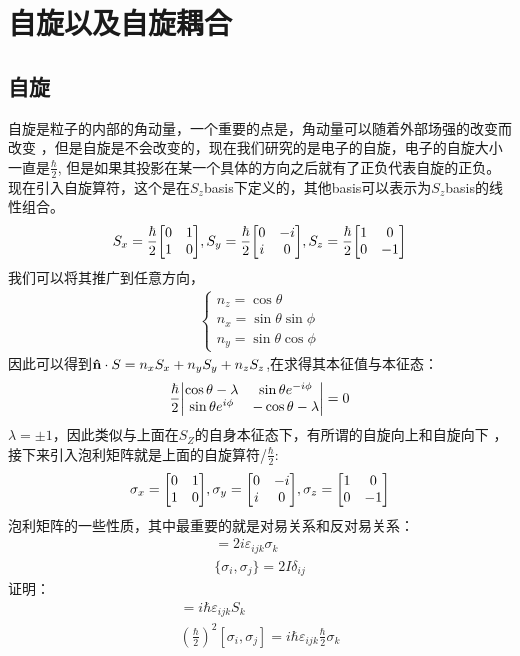 \documentclass[UTF8]{article}
\numberwithin{equation}{section}
\begin{document}
\section{自旋以及自旋耦合}
\subsection{自旋}
自旋是粒子的内部的角动量，一个重要的点是，角动量可以随着外部场强的改变而改变
，但是自旋是不会改变的，现在我们研究的是电子的自旋，电子的自旋大小一直是$\frac{\hbar}{2}$,
但是如果其投影在某一个具体的方向之后就有了正负代表自旋的正负。
现在引入自旋算符，这个是在$S_z$basis下定义的，其他basis可以表示为$S_z$basis的线性组合。
\begin{align*}
    S_x=\frac{\hbar}{2}\mqty[0 & 1 \\1&0],S_y=\frac{\hbar}{2}\mqty[0&-i\\i&0],S_z=\frac{\hbar}{2}\mqty[1&0\\0&-1]
\end{align*}
我们可以将其推广到任意方向，
\begin{align*}
    \begin{cases}
        n_z=\cos \theta           \\
        n_x=\sin \theta \sin \phi \\
        n_y=\sin \theta \cos\phi
    \end{cases}
\end{align*}
因此可以得到$\vu{n} \cdot S=n_xS_x+n_yS_y+n_zS_z$,在求得其本征值与本征态：
\begin{align*}
    \frac{\hbar}{2}\mqty|\cos \theta-\lambda & \sin \theta e^{-i\phi} \\ \sin\theta e^{i\phi}&-\cos \theta-\lambda|=0
\end{align*}
$\lambda=\pm 1$，因此类似与上面在$S_Z$的自身本征态下，有所谓的自旋向上和自旋向下
，接下来引入泡利矩阵就是上面的自旋算符/$\frac{\hbar}{2}$:
\begin{align*}
    \sigma_x=\mqty[0 & 1 \\1&0],\sigma_y=\mqty[0&-i\\i&0],\sigma_z=\mqty[1&0\\0&-1]
\end{align*}
泡利矩阵的一些性质，其中最重要的就是对易关系和反对易关系：
\begin{align*}
    [\sigma_i,\sigma_j]=2i\varepsilon_{ijk}\sigma_k \\
    \{\sigma_i,\sigma_j\}=2I\delta_{ij}
\end{align*}
证明：
\begin{align*}
    [S_i,S_j]=i\hbar \varepsilon_{ijk} S_k \\
    (\frac{\hbar}{2})^2[\sigma_i,\sigma_j]=i\hbar \varepsilon_{ijk} \frac{\hbar}{2}\sigma_k
\end{align*}
\end{document}
